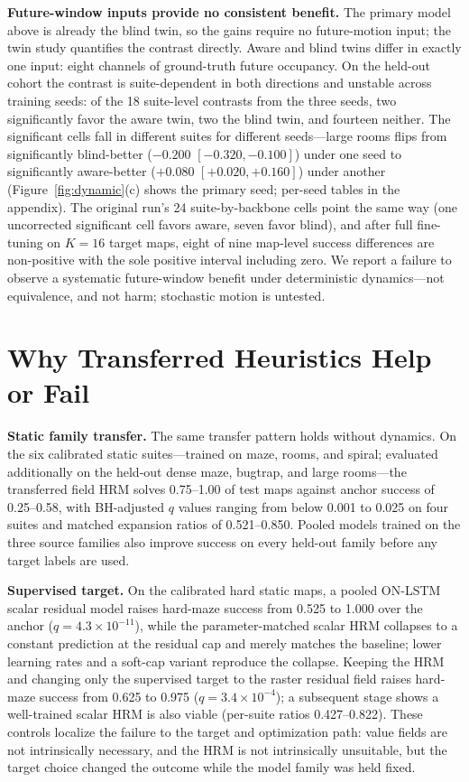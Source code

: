 \documentclass[letterpaper]{article} %
\begin{document}
\textbf{Future-window inputs provide no consistent benefit.} The primary model above is already the blind twin, so the gains require no future-motion input; the twin study quantifies the contrast directly. Aware and blind twins differ in exactly one input: eight channels of ground-truth future occupancy. On the held-out cohort the contrast is suite-dependent in both directions and unstable across training seeds: of the 18 suite-level contrasts from the three seeds, two significantly favor the aware twin, two the blind twin, and fourteen neither. The significant cells fall in different suites for different seeds---large rooms flips from significantly blind-better ($-0.200$ $[-0.320,-0.100]$) under one seed to significantly aware-better ($+0.080$ $[+0.020,+0.160]$) under another (Figure~\ref{fig:dynamic}(c) shows the primary seed; per-seed tables in the appendix). The original run's 24 suite-by-backbone cells point the same way (one uncorrected significant cell favors aware, seven favor blind), and after full fine-tuning on $K{=}16$ target maps, eight of nine map-level success differences are non-positive with the sole positive interval including zero. We report a failure to observe a systematic future-window benefit under deterministic dynamics---not equivalence, and not harm; stochastic motion is untested.

\section{Why Transferred Heuristics Help or Fail}

\textbf{Static family transfer.} The same transfer pattern holds without dynamics. On the six calibrated static suites---trained on maze, rooms, and spiral; evaluated additionally on the held-out dense maze, bugtrap, and large rooms---the transferred field HRM solves 0.75--1.00 of test maps against anchor success of 0.25--0.58, with BH-adjusted $q$ values ranging from below 0.001 to 0.025 on four suites and matched expansion ratios of 0.521--0.850. Pooled models trained on the three source families also improve success on every held-out family before any target labels are used.

\textbf{Supervised target.} On the calibrated hard static maps, a pooled ON-LSTM scalar residual model raises hard-maze success from 0.525 to 1.000 over the anchor ($q=4.3\times10^{-11}$), while the parameter-matched scalar HRM collapses to a constant prediction at the residual cap and merely matches the baseline; lower learning rates and a soft-cap variant reproduce the collapse. Keeping the HRM and changing only the supervised target to the raster residual field raises hard-maze success from 0.625 to 0.975 ($q=3.4\times10^{-4}$); a subsequent stage shows a well-trained scalar HRM is also viable (per-suite ratios 0.427--0.822). These controls localize the failure to the target and optimization path: value fields are not intrinsically necessary, and the HRM is not intrinsically unsuitable, but the target choice changed the outcome while the model family was held fixed.
\end{document}
